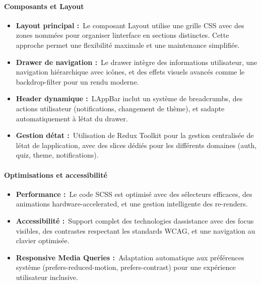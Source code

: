 \documentclass[12pt,a4paper,twoside,openright]{report}
\begin{document}
\hypertarget{composants-et-layout}{%
\paragraph{Composants et Layout}\label{composants-et-layout}}

\begin{itemize}
\item
  \textbf{Layout principal :}~Le composant Layout utilise une grille CSS
  avec des zones nommées pour organiser l\textquotesingle interface en
  sections distinctes. Cette approche permet une flexibilité maximale et
  une maintenance simplifiée.
\item
  \textbf{Drawer de navigation :}~Le drawer intègre des informations
  utilisateur, une navigation hiérarchique avec icônes, et des effets
  visuels avancés comme le backdrop-filter pour un rendu moderne.
\item
  \textbf{Header dynamique :}~L\textquotesingle AppBar inclut un système
  de breadcrumbs, des actions utilisateur (notifications, changement de
  thème), et s\textquotesingle adapte automatiquement à
  l\textquotesingle état du drawer.
\item
  \textbf{Gestion d\textquotesingle état :}~Utilisation de Redux Toolkit
  pour la gestion centralisée de l\textquotesingle état de
  l\textquotesingle application, avec des slices dédiés pour les
  différents domaines (auth, quiz, theme, notifications).
\end{itemize}

\hypertarget{optimisations-et-accessibilituxe9}{%
\paragraph{Optimisations et
accessibilité}\label{optimisations-et-accessibilituxe9}}

\begin{itemize}
\item
  \textbf{Performance :}~Le code SCSS est optimisé avec des sélecteurs
  efficaces, des animations hardware-accelerated, et une gestion
  intelligente des re-renders.
\item
  \textbf{Accessibilité :}~Support complet des technologies
  d\textquotesingle assistance avec des focus visibles, des contrastes
  respectant les standards WCAG, et une navigation au clavier optimisée.
\item
  \textbf{Responsive Media Queries :}~Adaptation automatique aux
  préférences système (prefers-reduced-motion, prefers-contrast) pour
  une expérience utilisateur inclusive.
\end{itemize}
\end{document}
